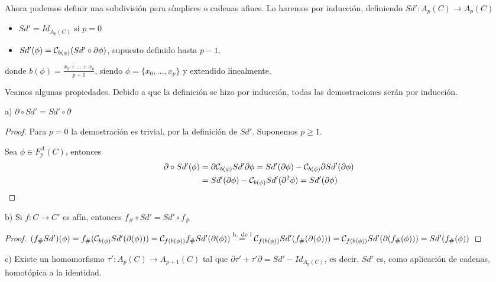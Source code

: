 Ahora podemos definir una subdivisión para símplices o cadenas afines. Lo haremos por inducción, definiendo ${Sd' \colon A_p(C) \to A_p(C)}$
\begin{itemize}
  \item $Sd' = Id_{A_p(C)}$ si $p = 0$
  \item $Sd'(\phi) = {\mathcal C}_{b(\phi)}(Sd' \circ \partial \phi)$, supuesto definido hasta $p-1$.
\end{itemize}
donde $b(\phi) = \frac{x_0 + \dots + x_p}{p+1}$, siendo $\phi = \{x_0, \dots, x_p\}$ y extendido linealmente.

Veamos algunas propiedades. Debido a que la definición se hizo por inducción, todas las demostraciones serán por inducción.

a) $\partial \circ Sd' = Sd' \circ \partial$

\begin{proof}
  Para $p = 0$ la demostración es trivial, por la definición de $Sd'$. Suponemos $p \geq 1$.

  Sea $\phi \in F_p^A(C)$, entonces
  \begin{align*}
    \partial \circ Sd'(\phi) &= \partial {\mathcal C}_{b(\phi)} Sd' \partial \phi = Sd'(\partial \phi) - {\mathcal C}_{b(\phi)} \partial Sd'(\partial \phi) \\
    &= Sd'(\partial \phi) - {\mathcal C}_{b(\phi)} Sd'(\partial^2 \phi) = Sd'(\partial \phi)
  \end{align*}
\end{proof}

b) Si $f \colon C \to C'$ es afín, entonces $f_\# \circ Sd' = Sd' \circ f_\#$

\begin{proof}
  $(f_\# Sd')(\phi) = f_\#({\mathcal C}_{b(\phi)} Sd'(\partial(\phi))) = {\mathcal C}_{f(b(\phi))} f_\# Sd'(\partial(\phi))\\ \stackrel{\text{h. de i}}{=}
  {\mathcal C}_{f(b(\phi))} Sd'(f_\#(\partial(\phi))) = {\mathcal C}_{f(b(\phi))} Sd'(\partial(f_\#(\phi))) = Sd'(f_\#(\phi))$
\end{proof}

c) Existe un homomorfismo $\tau' \colon A_p(C) \to A_{p+1}(C)$ tal que ${\partial \tau' + \tau' \partial = Sd' - Id_{A_p(C)}}$,
es decir, $Sd'$ es, como aplicación de cadenas, homotópica a la identidad.

